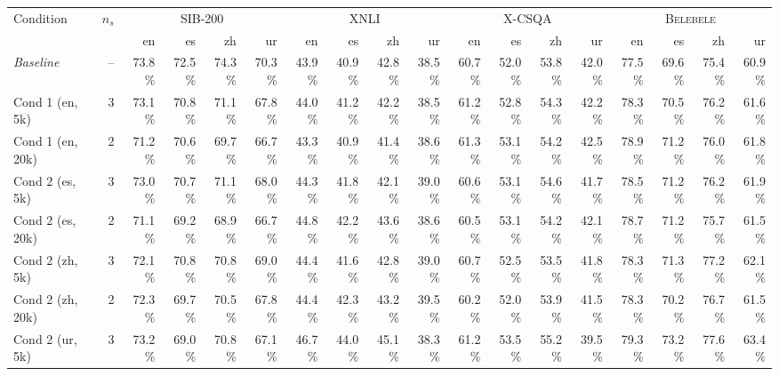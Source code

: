 \begin{table}[t]
  \centering
  \scriptsize
  \begin{tabular}{lrrrrrrrrrrrrrrrrr}
    \toprule
    Condition & $n_s$ & \multicolumn{4}{c}{\textsc{SIB-200}} & \multicolumn{4}{c}{\textsc{XNLI}} & \multicolumn{4}{c}{\textsc{X-CSQA}} & \multicolumn{4}{c}{\textsc{Belebele}} \\
    \cmidrule(lr){3-6} \cmidrule(lr){7-10} \cmidrule(lr){11-14} \cmidrule(lr){15-18}
     & & en & es & zh & ur & en & es & zh & ur & en & es & zh & ur & en & es & zh & ur \\
    \midrule
    \textit{Baseline} & -- & 73.8\% & 72.5\% & 74.3\% & 70.3\% & 43.9\% & 40.9\% & 42.8\% & 38.5\% & 60.7\% & 52.0\% & 53.8\% & 42.0\% & 77.5\% & 69.6\% & 75.4\% & 60.9\% \\
    Cond 1 (en, 5k) & 3 & 73.1\% & 70.8\% & 71.1\% & 67.8\% & 44.0\% & 41.2\% & 42.2\% & 38.5\% & 61.2\% & 52.8\% & 54.3\% & 42.2\% & 78.3\% & 70.5\% & 76.2\% & 61.6\% \\
    Cond 1 (en, 20k) & 2 & 71.2\% & 70.6\% & 69.7\% & 66.7\% & 43.3\% & 40.9\% & 41.4\% & 38.6\% & 61.3\% & 53.1\% & 54.2\% & 42.5\% & 78.9\% & 71.2\% & 76.0\% & 61.8\% \\
    Cond 2 (es, 5k) & 3 & 73.0\% & 70.7\% & 71.1\% & 68.0\% & 44.3\% & 41.8\% & 42.1\% & 39.0\% & 60.6\% & 53.1\% & 54.6\% & 41.7\% & 78.5\% & 71.2\% & 76.2\% & 61.9\% \\
    Cond 2 (es, 20k) & 2 & 71.1\% & 69.2\% & 68.9\% & 66.7\% & 44.8\% & 42.2\% & 43.6\% & 38.6\% & 60.5\% & 53.1\% & 54.2\% & 42.1\% & 78.7\% & 71.2\% & 75.7\% & 61.5\% \\
    Cond 2 (zh, 5k) & 3 & 72.1\% & 70.8\% & 70.8\% & 69.0\% & 44.4\% & 41.6\% & 42.8\% & 39.0\% & 60.7\% & 52.5\% & 53.5\% & 41.8\% & 78.3\% & 71.3\% & 77.2\% & 62.1\% \\
    Cond 2 (zh, 20k) & 2 & 72.3\% & 69.7\% & 70.5\% & 67.8\% & 44.4\% & 42.3\% & 43.2\% & 39.5\% & 60.2\% & 52.0\% & 53.9\% & 41.5\% & 78.3\% & 70.2\% & 76.7\% & 61.5\% \\
    Cond 2 (ur, 5k) & 3 & 73.2\% & 69.0\% & 70.8\% & 67.1\% & 46.7\% & 44.0\% & 45.1\% & 38.3\% & 61.2\% & 53.5\% & 55.2\% & 39.5\% & 79.3\% & 73.2\% & 77.6\% & 63.4\% \\

\end{tabular}
\end{table}
